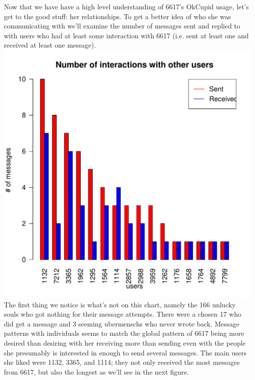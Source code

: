 \documentclass[a4paper,12pt]{article}
\begin{document}
Now that we have have a high level understanding of 6617's OkCupid usage, let's get to the good stuff: her relationships.  To get a better idea of who she was communicating with we'll examine the number of messages sent and replied to with users who had at least some interaction with 6617 (i.e. sent at least one and received at least one message).   
\includegraphics[scale=.75]{p2/interact.pdf}
The first thing we notice is what's not on this chart, namely the 166 unlucky souls who got nothing for their message attempts.  There were a chosen 17 who did get a message and 3 seeming ubermenschs who never wrote back.  Message patterns with individuals seems to match the global pattern of 6617 being more desired than desiring with her receiving more than sending even with the people she presumably is interested in enough to send several messages.  The main users she liked were 1132, 3365, and 1114; they not only received the most messages from 6617, but also the longest as we'll see in the next figure.  
\end{document}
